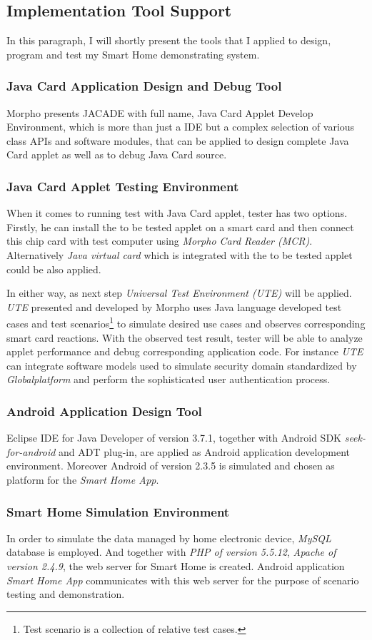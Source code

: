 \subsection{Implementation Tool Support} \label{secTS}
In this paragraph, I will shortly present the tools that I applied to design, program and test my Smart Home demonstrating system.
\subsubsection{Java Card Application Design and Debug Tool}
Morpho presents JACADE with full name, Java Card Applet Develop Environment, which is more than just a IDE but a complex selection of various class APIs and software modules, that can be applied to design complete Java Card applet as well as to debug Java Card source. 
\subsubsection{Java Card Applet Testing Environment}
When it comes to running test with Java Card applet, tester has two options. Firstly, he can install the to be tested applet on a smart card and then connect this chip card with test computer using \emph{Morpho Card Reader (MCR)}. Alternatively \emph{Java virtual card} which is integrated with the to be tested applet  could be also applied. 

In either way, as next step \emph{Universal Test Environment (UTE)} will be applied. \emph{UTE} presented and developed by Morpho uses Java language developed test cases
 and test scenarios\footnote{Test scenario is a collection of relative test cases.} to simulate desired use cases and observes corresponding smart card reactions. With the observed test result, tester will be able to analyze applet performance and debug corresponding application code. For instance \emph{UTE} can integrate software models used to simulate security domain standardized by \emph{Globalplatform} and perform the sophisticated user authentication process.
\subsubsection{Android Application Design Tool}
Eclipse IDE for Java Developer of version 3.7.1, together with Android SDK \emph{seek-for-android} and ADT plug-in, are applied as Android application development environment. Moreover Android of version 2.3.5 is simulated and chosen as platform for the \emph{Smart Home App}.
\subsubsection{Smart Home Simulation Environment}
In order to simulate the data managed by home electronic device, \emph{MySQL} database is employed. And together with \emph{PHP of version 5.5.12}, \emph{Apache of version 2.4.9}, the web server for Smart Home is created. Android application \emph{Smart Home App} communicates with this web server for the purpose of scenario testing and demonstration.

